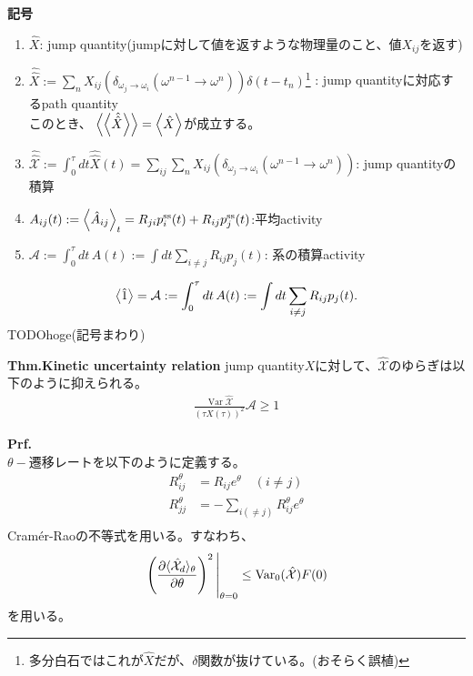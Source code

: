 \documentclass[a4paper,11pt]{jsarticle}
\numberwithin{equation}{section}
\begin{document}
\textbf{記号}
\begin{enumerate}
    \item $\hat{X}$: jump quantity(jumpに対して値を返すような物理量のこと、値$X_{ij}$を返す)
    \item $\hat{\hat{X}} := \sum_{n} X_{ij}(\delta_{\omega_j \to \omega_{i}}(\omega^{n-1} \to \omega^{n})) \delta(t-t_n)$\footnote{多分白石ではこれが$\hat{X}$だが、$\delta$関数が抜けている。(おそらく誤植)}
    : jump quantityに対応するpath quantity\\
    このとき、 $\ev{\ev{\hat{\hat{X}}}}= \ev{\hat{X}}$が成立する。
    \item $\hat{\hat{\mathcal{X}}} := \int_{0}^{\tau} dt \hat{\hat{X}}(t)= \sum_{ij}\sum_{n}X_{ij}(\delta_{\omega_j \to \omega_{i}}(\omega^{n-1} \to \omega^{n}))$: jump quantityの積算
    \item $ A_{ij}(t) := \expval{\hat{A}_{ij}}_t = R_{ji} p_i^{\text{ss}}(t) + R_{ij} p_j^{\text{ss}}(t)$:平均activity
    \item $\mathcal{A} := \int_{0}^{\tau} dt \, A(t) := \int dt \sum_{i \neq j} R_{ij} p_j(t)$: 系の積算activity
\end{enumerate}

\begin{align}
    \expval{\hat{1}} = \mathcal{A} := \int_{0}^{\tau} dt \, A(t) := \int dt \sum_{i \neq j} R_{ij} p_j(t).
\end{align}
TODOhoge(記号まわり)

\begin{itembox}[l]{\textbf{Thm.Kinetic uncertainty relation}}
    jump quantity$X$に対して、$\hat{\mathcal{X}}$のゆらぎは以下のように抑えられる。
    \begin{align}
        \frac{\operatorname{Var} \hat{\mathcal{X}}}{\left(\tau X(\tau)\right)^2} \mathcal{A} \geq 1
    \end{align}
\end{itembox}
\textbf{Prf.}\\
$\theta-$遷移レートを以下のように定義する。
\begin{align}
    R_{ij}^{\theta} &= R_{ij}e^{\theta } \quad (i \neq j)\\
    R_{jj}^{\theta} &= -\sum_{i (\neq j)} R_{ij}^{\theta}e^{\theta }\\
\end{align}
Cram\'er-Raoの不等式を用いる。すなわち、
\begin{align}
    \eval{\left( \frac{\partial \langle {\hat{\mathcal{X}}_{d}} \rangle_\theta}{\partial \theta} \right)^2}_{\theta = 0}
    \leq \mathrm{Var}_{0} (\hat{\mathcal{X}}) F(0) \label{eq:2}
    \end{align}
    を用いる。
\end{document}
